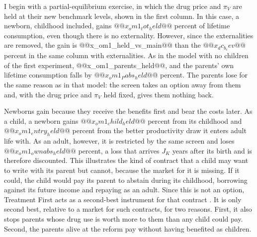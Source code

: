 \documentclass[10pt]{article}
\begin{document}
I begin with a partial-equilibrium exercise, in which the drug price and $\pi_V$ are held at their new benchmark levels, shown in the first column. In this case, a newborn, childhood included, gains $@@x_om1_tot_held@@$ percent of lifetime consumption, even though there is no externality. However, since the externalities are removed, the gain is @@x_om1_held_vs_main@@ than the $@@x_dc_b_cev@@$ percent in the same column with externalities. As in the model with no children of the first experiment, @@x_om1_parents_held@@, and the parents' own lifetime consumption falls by $@@x_om1_Pabs_held@@$ percent. The parents lose for the same reason as in that model: the screen takes an option away from them and, with the drug price and $\pi_V$ held fixed, gives them nothing back.

Newborns gain because they receive the benefits first and bear the costs later. As a child, a newborn gains $@@x_om1_child_held@@$ percent from its childhood and $@@x_om1_entry_held@@$ percent from the better productivity draw it enters adult life with. As an adult, however, it is restricted by the same screen and loses $@@x_om1_ownabs_held@@$ percent, a loss that arrives $J_K$ years after its birth and is therefore discounted. This illustrates the kind of contract that a child may want to write with its parent but cannot, because the market for it is missing. If it could, the child would pay its parent to abstain during its childhood, borrowing against its future income and repaying as an adult. Since this is not an option, Treatment First acts as a second-best instrument for that contract .  It is only second best, relative to a market for such contracts, for two reasons. First, it also stops parents whose drug use is worth more to them than  any child could pay. Second, the parents alive at the reform pay without having benefited as children.  
\end{document}
